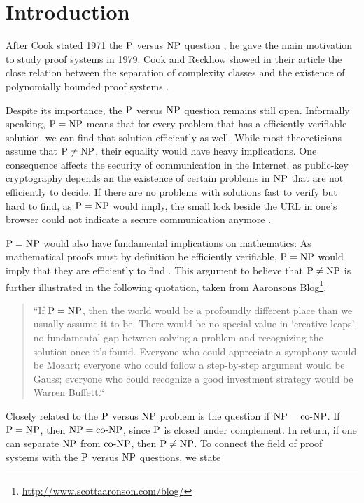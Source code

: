 \chapter{Introduction}
  After Cook stated 1971 the \(\P\) versus \(\NP\) question \cite{C71}, he gave the main motivation to study proof systems in 1979. Cook and Reckhow showed in their article the close relation between the separation of complexity classes and the existence of polynomially bounded proof systems \cite{CR79}.

  Despite its importance, the \(\P\) versus \(\NP\) question remains still open. Informally speaking, \(\P = \NP\) means that for every problem that has a efficiently verifiable solution, we can find that solution efficiently as well. While most theoreticians assume that \(\P \neq \NP\), their equality would have heavy implications. One consequence affects the security of communication in the Internet, as public-key cryptography depends an the existence of certain problems in \(\NP\) that are not efficiently to decide. If there are no problems with solutions fast to verify but hard to find, as \(\P = \NP\) would imply, the small lock beside the URL in one's browser could not indicate a secure communication anymore \cite{F09}.

  \(\P = \NP\) would also have fundamental implications on mathematics: As mathematical proofs must by definition be efficiently verifiable, \(\P = \NP\) would imply that they are efficiently to find \cite{CR79}. This argument to believe that \(\P \neq \NP\) is further illustrated in the following quotation, taken from Aaronsons Blog\footnote{\url{http://www.scottaaronson.com/blog/}}.

  \begin{quotation}
    ``If \(\P=\NP\), then the world would be a profoundly different place than we usually assume it to be. There would be no special value in `creative leaps', no fundamental gap between solving a problem and recognizing the solution once it's found. Everyone who could appreciate a symphony would be Mozart; everyone who could follow a step-by-step argument would be Gauss; everyone who could recognize a good investment strategy would be Warren Buffett.``
  \end{quotation}

  Closely related to the \(\P\) versus \(\NP\) problem is the question if \(\NP = \coNP\). If \(\P = \NP\), then \(\NP = \coNP\), since \(\P\) is closed under complement. In return, if one can separate \(\NP\) from \(\coNP\), then \(\P \neq \NP\). To connect the field of proof systems with the \(\P\) versus \(\NP\) questions, we state

